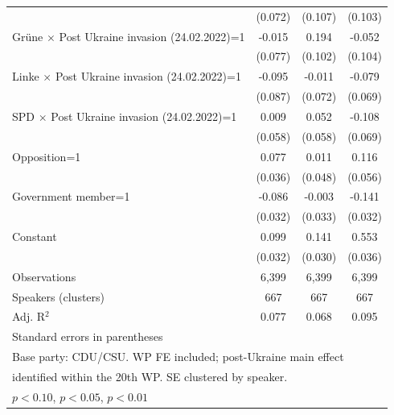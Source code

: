 \begin{table}[htbp]
\begin{tabular}{l*{3}{c}}
                    &     (0.072)         &     (0.107)         &     (0.103)         \\
\addlinespace
Grüne $\times$ Post Ukraine invasion (24.02.2022)=1&      -0.015         &       0.194\sym{*}  &      -0.052         \\
                    &     (0.077)         &     (0.102)         &     (0.104)         \\
\addlinespace
Linke $\times$ Post Ukraine invasion (24.02.2022)=1&      -0.095         &      -0.011         &      -0.079         \\
                    &     (0.087)         &     (0.072)         &     (0.069)         \\
\addlinespace
SPD $\times$ Post Ukraine invasion (24.02.2022)=1&       0.009         &       0.052         &      -0.108         \\
                    &     (0.058)         &     (0.058)         &     (0.069)         \\
\addlinespace
Opposition=1        &       0.077\sym{**} &       0.011         &       0.116\sym{**} \\
                    &     (0.036)         &     (0.048)         &     (0.056)         \\
\addlinespace
Government member=1 &      -0.086\sym{***}&      -0.003         &      -0.141\sym{***}\\
                    &     (0.032)         &     (0.033)         &     (0.032)         \\
\addlinespace
Constant            &       0.099\sym{***}&       0.141\sym{***}&       0.553\sym{***}\\
                    &     (0.032)         &     (0.030)         &     (0.036)         \\
\midrule
Observations        &       6,399         &       6,399         &       6,399         \\
Speakers (clusters) &         667         &         667         &         667         \\
Adj. R$^2$          &       0.077         &       0.068         &       0.095         \\
\bottomrule
\multicolumn{4}{l}{\footnotesize Standard errors in parentheses}\\
\multicolumn{4}{l}{\footnotesize Base party: CDU/CSU. WP FE included; post-Ukraine main effect}\\
\multicolumn{4}{l}{\footnotesize identified within the 20th WP. SE clustered by speaker.}\\
\multicolumn{4}{l}{\footnotesize \sym{*} \(p<0.10\), \sym{**} \(p<0.05\), \sym{***} \(p<0.01\)}\\
\end{tabular}
\end{table}
